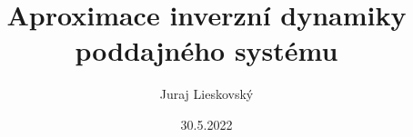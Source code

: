 \documentclass{beamer}
\title{Aproximace inverzní dynamiky poddajného systému}
\author{Juraj Lieskovský}
\institute{ČVUT - ústav mechaniky, biomechaniky a mechatroniky}
\date{30.5.2022}
\begin{document}
	\frame{\titlepage}

	
	
	
	
	
\end{document}
